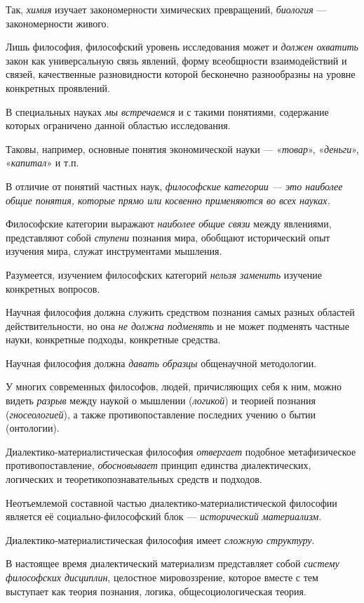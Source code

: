 \documentclass[a4paper,14pt,russian]{extreport}
\begin{document}
Так, \emph{химия} изучает закономерности химических превращений, \emph{биология} --- закономерности живого.

Лишь философия, философский уровень исследования может и \emph{должен охватить} закон как универсальную связь явлений, форму всеобщности взаимодействий и связей, качественные разновидности которой бесконечно разнообразны на уровне конкретных проявлений.

В специальных науках \emph{мы встречаемся} и с такими понятиями, содержание которых ограничено данной областью исследования.

Таковы, например, основные понятия экономической науки --- «\emph{товар}», «\emph{деньги}», «\emph{капитал}» и т.п.

В отличие от понятий частных наук, \emph{философские категории --- это наиболее общие понятия, которые прямо или косвенно применяются во всех науках.}

Философские категории выражают \emph{наиболее общие связи} между явлениями, представляют собой \emph{ступени} познания мира, обобщают исторический опыт изучения мира, служат инструментами мышления.

Разумеется, изучением философских категорий \emph{нельзя заменить} изучение конкретных вопросов.

Научная философия должна служить средством познания самых разных областей действительности, но она \emph{не должна подменять} и не может подменять частные науки, конкретные подходы, конкретные средства.

Научная философия должна \emph{давать образцы} общенаучной методологии.

У многих современных философов, людей, причисляющих себя к ним, можно видеть \emph{разрыв} между наукой о мышлении (\emph{логикой}) и теорией познания (\emph{гносеологией}), а также противопоставление последних учению о бытии (онтологии).

Диалектико-материалистическая философия \emph{отвергает} подобное метафизическое противопоставление, \emph{обосновывает} принцип единства диалектических, логических и теоретикопознавательных средств и подходов.

Неотъемлемой составной частью диалектико-материалистической философии является её социально-философский блок --- \emph{исторический материализм}.

Диалектико-материалистическая философия имеет \emph{сложную структуру}.

В настоящее время диалектический материализм представляет собой \emph{систему философских дисциплин}, целостное мировоззрение, которое вместе с тем выступает как теория познания, логика, общесоциологическая теория.
\end{document}
